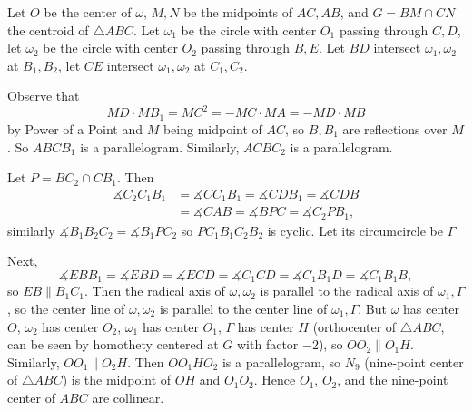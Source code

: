 Let $O$ be the center of $\omega$, $M,N$ be the midpoints of $AC,AB$, and $G=BM\cap CN$ the centroid of $\triangle{ABC}$. Let $\omega_1$ be the circle with center $O_1$ passing through $C,D$, let $\omega_2$ be the circle with center $O_2$ passing through $B,E$. Let $BD$ intersect $\omega_1,\omega_2$ at $B_1,B_2$, let $CE$ intersect $\omega_1,\omega_2$ at $C_1,C_2$.

Observe that \[MD\cdot MB_1=MC^2=-MC\cdot MA=-MD\cdot MB\] by Power of a Point and $M$ being midpoint of $AC$, so $B,B_1$ are reflections over $M$. So $ABCB_1$ is a parallelogram. Similarly, $ACBC_2$ is a parallelogram.

Let $P=BC_2\cap CB_1$. Then
\begin{align*}
	\measuredangle{C_2C_1B_1}&=\measuredangle{CC_1B_1}=\measuredangle{CDB_1}=\measuredangle{CDB}\\
	&=\measuredangle{CAB}=\measuredangle{BPC}=\measuredangle{C_2PB_1},
\end{align*}
similarly $\measuredangle{B_1B_2C_2}=\measuredangle{B_1PC_2}$ so $PC_1B_1C_2B_2$ is cyclic. Let its circumcircle be $\Gamma$

Next, \[\measuredangle{EBB_1}=\measuredangle{EBD}=\measuredangle{ECD}=\measuredangle{C_1CD}=\measuredangle{C_1B_1D}=\measuredangle{C_1B_1B},\] so $EB\parallel B_1C_1$. Then the radical axis of $\omega,\omega_2$ is parallel to the radical axis of $\omega_1,\Gamma$, so the center line of $\omega,\omega_2$ is parallel to the center line of $\omega_1,\Gamma$. But $\omega$ has center $O$, $\omega_2$ has center $O_2$, $\omega_1$ has center $O_1$, $\Gamma$ has center $H$ (orthocenter of $\triangle{ABC}$, can be seen by homothety centered at $G$ with factor $-2$), so $OO_2\parallel O_1H$. Similarly, $OO_1\parallel O_2H$. Then $OO_1HO_2$ is a parallelogram, so $N_9$ (nine-point center of $\triangle{ABC}$) is the midpoint of $OH$ and $O_1O_2$. Hence $O_1$, $O_2$, and the nine-point center of $ABC$ are collinear.